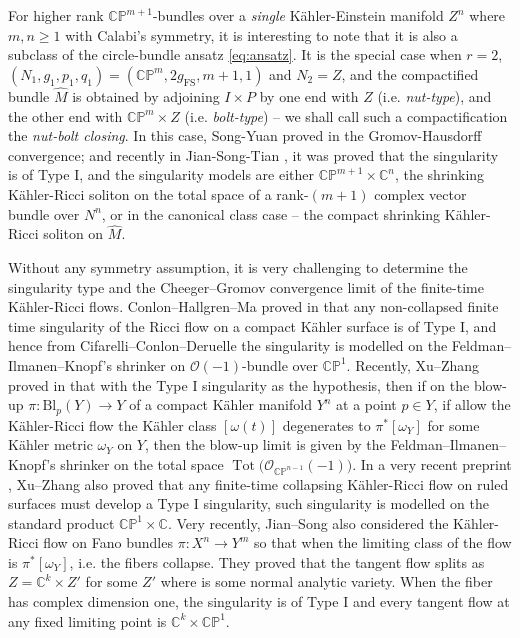 \documentclass[11pt]{amsart}
\theoremstyle{plain}
\numberwithin{equation}{section}
\theoremstyle{definition}
\theoremstyle{remark}
\begin{document}
For higher rank $\mathbb{CP}^{m+1}$-bundles over a \emph{single} K\"ahler-Einstein manifold $Z^n$ where $m, n \geq 1$ with Calabi's symmetry, it is interesting to note that it is also a subclass of the circle-bundle ansatz \eqref{eq:ansatz}. It is the special case when $r = 2$, $(N_1, g_1, p_1, q_1) = (\mathbb{CP}^m, 2g_{\textrm{FS}}, m+1, 1)$ and $N_2 = Z$, and the compactified bundle $\widehat{M}$ is obtained by adjoining $I \times P$ by one end with $Z$ (i.e. \emph{nut-type}), and the other end with $\mathbb{CP}^m \times Z$ (i.e. \emph{bolt-type}) -- we shall call such a compactification the \emph{nut-bolt closing}. In this case, Song-Yuan proved in \cite{SY} the Gromov-Hausdorff convergence; and recently in Jian-Song-Tian \cite{JST}, it was proved that the singularity is of Type I, and the singularity models are either $\mathbb{CP}^{m+1} \times \mathbb{C}^n$, the shrinking K\"ahler-Ricci soliton on the total space of a rank-$(m+1)$ complex vector bundle over $N^n$, or in the canonical class case -- the compact shrinking K\"ahler-Ricci soliton on $\widehat{M}$.

Without any symmetry assumption, it is very challenging to determine the singularity type and the Cheeger--Gromov convergence limit of the finite-time K\"ahler-Ricci flows. Conlon--Hallgren--Ma proved in \cite{CHM} that any non-collapsed finite time singularity of the Ricci flow on a compact K\"ahler surface is of Type I, and hence from Cifarelli--Conlon--Deruelle \cite{CD} the singularity is modelled on the Feldman--Ilmanen--Knopf's shrinker on $\mathcal{O}(-1)$-bundle over $\mathbb{CP}^1$. Recently, Xu--Zhang proved in \cite{XZ} that with the Type I singularity as the hypothesis, then if on the blow-up $\pi : \textrm{Bl}_p(Y) \to Y$ of a compact K\"ahler manifold $Y^n$ at a point $p \in Y$, if allow the K\"ahler-Ricci flow the K\"ahler class $[\omega(t)]$ degenerates to $\pi^*[\omega_Y]$ for some K\"ahler metric $\omega_Y$ on $Y$, then the blow-up limit is given by the Feldman--Ilmanen--Knopf's shrinker on the total space $\operatorname{Tot}\big(\mathcal{O}_{\mathbb{CP}^{n-1}}(-1)\big)$. In a very recent preprint \cite{XZ2}, Xu--Zhang also proved that any finite-time collapsing K\"ahler-Ricci flow on ruled surfaces must develop a Type I singularity, such singularity is modelled on the standard product $\mathbb{CP}^1 \times \mathbb{C}$.  Very recently, Jian--Song \cite{JS26} also considered the K\"ahler-Ricci flow on Fano bundles $\pi: X^n \to Y^m$ so that when the limiting class of the flow is $\pi^*[\omega_Y]$, i.e. the fibers collapse. They proved that the tangent flow splits as $Z = \mathbb{C}^k \times Z'$ for some $Z'$ where is some normal analytic variety. When the fiber has complex dimension one, the singularity is of Type I and every tangent flow at any fixed limiting point is $\mathbb{C}^k \times \mathbb{CP}^1$.
\end{document}
